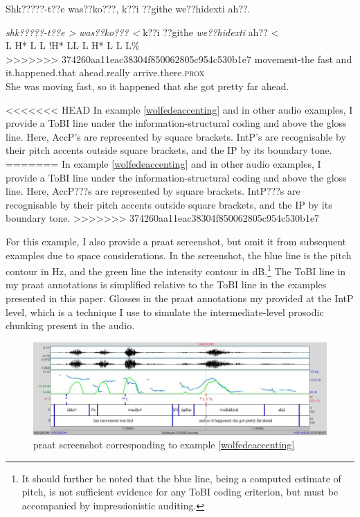 \documentclass[output=paper]{LSP/langsci}
\begin{document}
\ea\label{wolfedeaccenting}
Shk?????-t??e was??ko???, k??i ??githe we??hidexti ah??.\footnotemark

\glll 	\emph{shk?????-t??e >}	\emph{was??ko??? <}		k??i 		??githe 		\emph{we??hidexti}		{ah?? <}\\
	{\ob L H* L\cb}		{\ob L !H* L\cb{}L}		{\ob L}	{}			{H* L}				{\cb{}L L\%}\\
>>>>>>> 374260aa11eac38304f850062805c954c530b1e7
	movement-the 		fast 				and 		it.happened.that 	ahead.really	 		arrive.there.\textsc{prox}\\
\glt She was moving fast, so it happened that she got pretty far ahead.
\z

<<<<<<< HEAD
In example \ref{wolfedeaccenting} and in other audio examples, I provide a ToBI line under the information-structural coding and above the gloss line. Here, AccP’s are represented by square brackets. IntP’s are recognisable by their pitch accents outside square brackets, and the IP by its boundary tone. 
=======
In example \ref{wolfedeaccenting} and in other audio examples, I provide a ToBI line under the information-structural coding and above the gloss line. Here, AccP???s are represented by square brackets. IntP???s are recognisable by their pitch accents outside square brackets, and the IP by its boundary tone. 
>>>>>>> 374260aa11eac38304f850062805c954c530b1e7

For this example, I also provide a praat screenshot, but omit it from subsequent examples due to space considerations. In the screenshot, the blue line is the pitch contour in Hz, and the green line the intensity contour in dB.\footnote{It should further be noted that the blue line, being a computed estimate of pitch, is not sufficient evidence for any ToBI coding criterion, but must be accompanied by impressionistic auditing.} The ToBI line in my praat annotations is simplified relative to the ToBI line in the examples presented in this paper. Glosses in the praat annotations my provided at the IntP level, which is a technique I use to simulate the intermediate-level prosodic chunking present in the audio.

\begin{figure}\includegraphics[width=12cm]{figures/Gordon1}\caption{praat screenshot corresponding to example \ref{wolfedeaccenting}}\label{wolfedeaccentingscreenshot}\end{figure}
\end{document}

